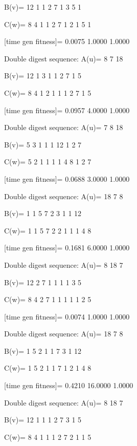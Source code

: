 B(v)=
    12     1     1     2     7     1     3     5     1

C(w)=
     8     4     1     1     2     7     1     2     1     5     1

[time gen fitness]=
    0.0075    1.0000    1.0000

Double digest sequence:
A(u)=
     8     7    18

B(v)=
    12     1     3     1     1     2     7     1     5

C(w)=
     8     4     1     2     1     1     1     2     7     1     5

[time gen fitness]=
    0.0957    4.0000    1.0000

Double digest sequence:
A(u)=
     7     8    18

B(v)=
     5     3     1     1     1    12     1     2     7

C(w)=
     5     2     1     1     1     1     4     8     1     2     7

[time gen fitness]=
    0.0688    3.0000    1.0000

Double digest sequence:
A(u)=
    18     7     8

B(v)=
     1     1     5     7     2     3     1     1    12

C(w)=
     1     1     5     7     2     2     1     1     1     4     8

[time gen fitness]=
    0.1681    6.0000    1.0000

Double digest sequence:
A(u)=
     8    18     7

B(v)=
    12     2     7     1     1     1     1     3     5

C(w)=
     8     4     2     7     1     1     1     1     1     2     5

[time gen fitness]=
    0.0074    1.0000    1.0000

Double digest sequence:
A(u)=
    18     7     8

B(v)=
     1     5     2     1     1     7     3     1    12

C(w)=
     1     5     2     1     1     7     1     2     1     4     8

[time gen fitness]=
    0.4210   16.0000    1.0000

Double digest sequence:
A(u)=
     8    18     7

B(v)=
    12     1     1     1     2     7     3     1     5

C(w)=
     8     4     1     1     1     2     7     2     1     1     5

